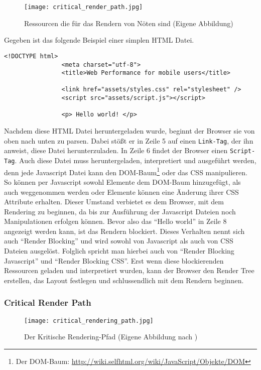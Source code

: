 			\begin{figure}[htbp]
				\begin{center}
					\texttt{[image: critical\_render\_path.jpg]}
					\caption{Ressourcen die für das Rendern von Nöten sind (Eigene Abbildung)}
					\label{fig:critical_render_path}
				\end{center}
			\end{figure}

			Gegeben ist das folgende Beispiel einer simplen HTML Datei.

			\begin{lstlisting}[captionpos=b, caption=Beispiel Code, label=beispielCode]
				<!DOCTYPE html>
				<meta charset="utf-8">
				<title>Web Performance for mobile users</title>

				<link href="assets/styles.css" rel="stylesheet" />
				<script src="assets/script.js"></script>

				<p> Hello world! </p>

			\end{lstlisting}

			Nachdem diese HTML Datei heruntergeladen wurde, beginnt der Browser sie von oben nach unten zu parsen. Dabei stößt er in Zeile 5 auf einen \texttt{Link-Tag}, der ihn anweist, diese Datei herunterzuladen. In Zeile 6 findet der Browser einen \texttt{Script-Tag}. Auch diese Datei muss heruntergeladen, interpretiert und ausgeführt werden, denn jede Javascript Datei kann den DOM-Baum\footnote{Der DOM-Baum: \url{http://wiki.selfhtml.org/wiki/JavaScript/Objekte/DOM}} oder das CSS manipulieren. So können per Javascript sowohl Elemente dem DOM-Baum hinzugefügt, als auch weggenommen werden oder Elemente können eine Änderung ihrer CSS Attribute erhalten. Dieser Umstand verbietet es dem Browser, mit dem Rendering zu beginnen, da bis zur Ausführung der Javascript Dateien noch Manipulationen erfolgen können.
			Bevor also das "`Hello world"' in Zeile 8 angezeigt werden kann, ist das Rendern blockiert. Dieses Verhalten nennt sich auch "`Render Blocking"' und wird sowohl von Javascript als auch von CSS Dateien ausgelöst. Folglich spricht man hierbei auch von "`Render Blocking Javascript"' und "`Render Blocking CSS"'. Erst wenn diese blockierenden Ressourcen geladen und interpretiert wurden, kann der Browser den Render Tree erstellen, das Layout festlegen und schlussendlich mit dem Rendern beginnen. 



		\subsubsection{Critical Render Path} %
		\label{ssub:critical_render_path}
			\begin{figure}[htbp]
				\begin{center}
					\texttt{[image: critical\_rendering\_path.jpg]}
					\caption{Der Kritische Rendering-Pfad (Eigene Abbildung nach \autocite[p. 3]{santana14})}
					\label{fig:critical_rendering_path}
				\end{center}
			\end{figure}
			

